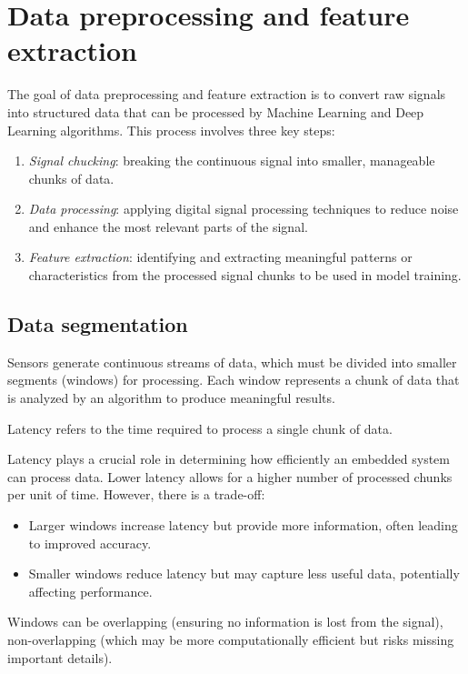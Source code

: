 \section{Data preprocessing and feature extraction}

The goal of data preprocessing and feature extraction  is to convert raw signals into structured data that can be processed by Machine Learning and Deep Learning algorithms.
This process involves three key steps:
\begin{enumerate}
    \item \textit{Signal chucking}: breaking the continuous signal into smaller, manageable chunks of data.
    \item \textit{Data processing}: applying digital signal processing techniques to reduce noise and enhance the most relevant parts of the signal.
    \item \textit{Feature extraction}: identifying and extracting meaningful patterns or characteristics from the processed signal chunks to be used in model training.
\end{enumerate}

\subsection{Data segmentation}
Sensors generate continuous streams of data, which must be divided into smaller segments (windows) for processing. 
Each window represents a chunk of data that is analyzed by an algorithm to produce meaningful results.
\begin{definition}
    Latency refers to the time required to process a single chunk of data.
\end{definition}
\noindent Latency plays a crucial role in determining how efficiently an embedded system can process data. 
Lower latency allows for a higher number of processed chunks per unit of time. However, there is a trade-off:
\begin{itemize}
    \item Larger windows increase latency but provide more information, often leading to improved accuracy.
    \item Smaller windows reduce latency but may capture less useful data, potentially affecting performance.
\end{itemize}
\noindent Windows can be overlapping (ensuring no information is lost from the signal), non-overlapping (which may be more computationally efficient but risks missing important details).

